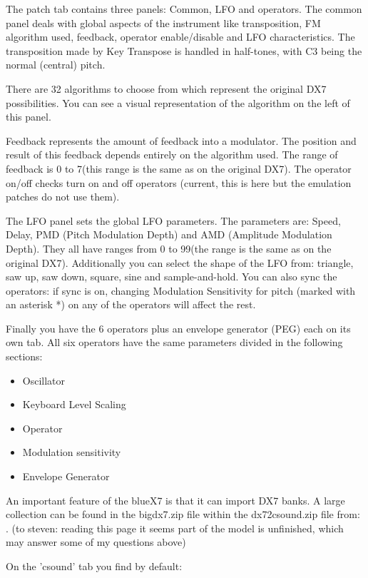 The patch tab contains three panels: Common, LFO and operators. The
common panel deals with global aspects of the instrument like
transposition, FM algorithm used, feedback, operator enable/disable and
LFO characteristics. The transposition made by Key Transpose is handled
in half-tones, with C3 being the normal (central) pitch.

There are 32 algorithms to choose from which represent the original DX7
possibilities. You can see a visual representation of the algorithm on
the left of this panel.

Feedback represents the amount of feedback into a modulator. The
position and result of this feedback depends entirely on the algorithm
used. The range of feedback is 0 to 7(this range is the same as on the
original DX7). The operator on/off checks turn on and off operators
(current, this is here but the emulation patches do not use them).

The LFO panel sets the global LFO parameters. The parameters are: Speed,
Delay, PMD (Pitch Modulation Depth) and AMD (Amplitude Modulation
Depth). They all have ranges from 0 to 99(the range is the same as on
the original DX7). Additionally you can select the shape of the LFO
from: triangle, saw up, saw down, square, sine and sample-and-hold. You
can also sync the operators: if sync is on, changing Modulation
Sensitivity for pitch (marked with an asterisk *) on any of the
operators will affect the rest.

Finally you have the 6 operators plus an envelope generator (PEG) each
on its own tab. All six operators have the same parameters divided in
the following sections:

\begin{itemize}
\item
  Oscillator
\item
  Keyboard Level Scaling
\item
  Operator
\item
  Modulation sensitivity
\item
  Envelope Generator
\end{itemize}

An important feature of the blueX7 is that it can import DX7 banks. A
large collection can be found in the bigdx7.zip file within the
dx72csound.zip file from:
\href{http://www.parnasse.com/dx72csnd.shtml}{}. (to steven: reading
this page it seems part of the model is unfinished, which may answer
some of my questions above)

On the 'csound' tab you find by default:

